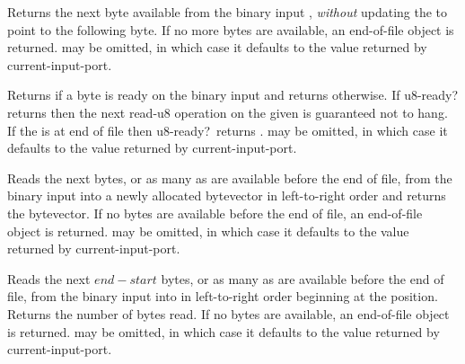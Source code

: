 \begin{entry}{%
}

Returns the next byte available from the binary input ,
{\em without} updating the  to point to the following
byte.  If no more bytes are available, an end-of-file object is
returned.   may be omitted, in which case it defaults to the
value returned by {\cf current-input-port}.

\end{entry}

\begin{entry}{%
}

Returns \schtrue{} if a byte is ready on the binary input 
and returns \schfalse{} otherwise.  If {\cf u8-ready?} returns
\schtrue{} then the next {\cf read-u8} operation on the given
 is guaranteed not to hang.  If the  is at end of
file then {\cf u8-ready?}\ returns \schtrue.   may be
omitted, in which case it defaults to the value returned by {\cf
  current-input-port}.

\end{entry}

\begin{entry}{%
}

Reads the next  bytes, or as many as are available before the end of file,
from the binary
input  into a newly allocated bytevector in left-to-right order
and returns the bytevector.
If no bytes are available before the end of file,
an end-of-file object is returned.
 may be
omitted, in which case it defaults to the value returned by {\cf
  current-input-port}.

\end{entry}

\begin{entry}{%
}

Reads the next $end - start$ bytes, or as many as are available
before the end of file,
from the binary
input  into  in left-to-right order
beginning at the  position.
Returns the number of bytes read.
If no bytes are available, an end-of-file object is returned.
 may be
omitted, in which case it defaults to the value returned by {\cf
  current-input-port}.

\end{entry}



